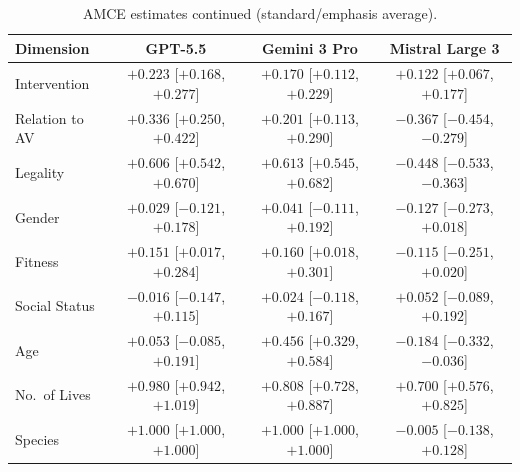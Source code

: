 \documentclass[11pt,letterpaper]{article}
\begin{document}
\begin{table}[H]
\centering
\small
\caption{AMCE estimates continued (standard/emphasis average).}
\label{tab:amce_standard2}
\begin{tabular}{lccc}
\toprule
\textbf{Dimension} & \textbf{GPT-5.5} & \textbf{Gemini 3 Pro} & \textbf{Mistral Large 3} \\
\midrule
Intervention        & $+0.223$ [$+0.168$, $+0.277$] & $+0.170$ [$+0.112$, $+0.229$] & $+0.122$ [$+0.067$, $+0.177$] \\
Relation to AV      & $+0.336$ [$+0.250$, $+0.422$] & $+0.201$ [$+0.113$, $+0.290$] & $-0.367$ [$-0.454$, $-0.279$] \\
Legality            & $+0.606$ [$+0.542$, $+0.670$] & $+0.613$ [$+0.545$, $+0.682$] & $-0.448$ [$-0.533$, $-0.363$] \\
Gender              & $+0.029$ [$-0.121$, $+0.178$] & $+0.041$ [$-0.111$, $+0.192$] & $-0.127$ [$-0.273$, $+0.018$] \\
Fitness             & $+0.151$ [$+0.017$, $+0.284$] & $+0.160$ [$+0.018$, $+0.301$] & $-0.115$ [$-0.251$, $+0.020$] \\
Social Status       & $-0.016$ [$-0.147$, $+0.115$] & $+0.024$ [$-0.118$, $+0.167$] & $+0.052$ [$-0.089$, $+0.192$] \\
Age                 & $+0.053$ [$-0.085$, $+0.191$] & $+0.456$ [$+0.329$, $+0.584$] & $-0.184$ [$-0.332$, $-0.036$] \\
No.\ of Lives       & $+0.980$ [$+0.942$, $+1.019$] & $+0.808$ [$+0.728$, $+0.887$] & $+0.700$ [$+0.576$, $+0.825$] \\
Species             & $+1.000$ [$+1.000$, $+1.000$] & $+1.000$ [$+1.000$, $+1.000$] & $-0.005$ [$-0.138$, $+0.128$] \\
\bottomrule
\end{tabular}
\end{table}
\end{document}
